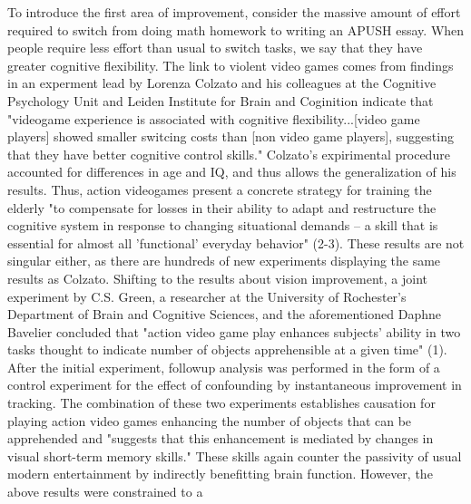 \documentclass[12pt]{article}
\begin{document}
\begin{flushleft}
To introduce the first area of improvement, consider the massive amount of effort required to switch from doing math homework to writing an APUSH essay. When people require less effort than usual to switch tasks, we say that they have greater cognitive flexibility. The link to violent video games comes from findings in an experment lead by Lorenza Colzato and his colleagues at the Cognitive Psychology Unit and Leiden Institute for Brain and Coginition indicate that "videogame experience is associated with cognitive flexibility...[video game players] showed smaller switcing costs than [non video game players], suggesting that they have better cognitive control skills." Colzato's expirimental procedure accounted for differences in age and IQ, and thus allows the generalization of his results. Thus, action videogames present a concrete strategy for training the elderly "to compensate for losses in their ability to adapt and restructure the cognitive system in response to changing situational demands -- a skill that is essential for almost all 'functional' everyday behavior" (2-3). These results are not singular either, as there are hundreds of new experiments displaying the same results as Colzato. Shifting to the results about vision improvement, a joint experiment by C.S. Green, a researcher at the University of Rochester's Department of Brain and Cognitive Sciences, and the aforementioned Daphne Bavelier concluded that "action video game play enhances subjects' ability in two tasks thought to indicate number of objects apprehensible at a given time" (1). After the initial experiment, followup analysis was performed in the form of a control experiment for the effect of confounding by instantaneous improvement in tracking. The combination of these two experiments establishes causation for playing action video games enhancing the number of objects that can be apprehended and "suggests that this enhancement is mediated by changes in visual short-term memory skills." These skills again counter the passivity of usual modern entertainment by indirectly benefitting brain function. However, the above results were constrained to a

\end{flushleft}
\end{document}
